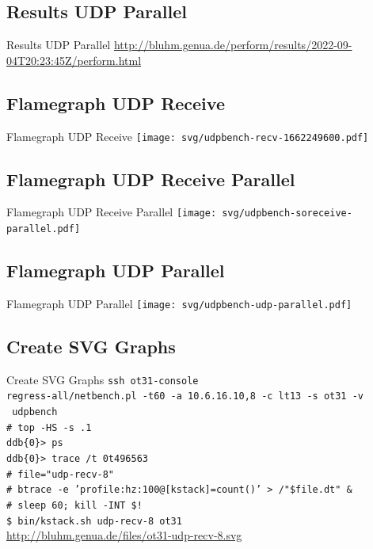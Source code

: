 \documentclass[14pt,aspectratio=169]{beamer}
\begin{document}
\subsection{Results UDP Parallel}
\begin{frame}{Results UDP Parallel}
    \url{
    http://bluhm.genua.de/perform/results/2022-09-04T20:23:45Z/perform.html}
\end{frame}

\subsection{Flamegraph UDP Receive}
\begin{frame}{Flamegraph UDP Receive}
    \texttt{[image: svg/udpbench-recv-1662249600.pdf]}
\end{frame}

\subsection{Flamegraph UDP Receive Parallel}
\begin{frame}{Flamegraph UDP Receive Parallel}
    \texttt{[image: svg/udpbench-soreceive-parallel.pdf]}
\end{frame}

\subsection{Flamegraph UDP Parallel}
\begin{frame}{Flamegraph UDP Parallel}
    \texttt{[image: svg/udpbench-udp-parallel.pdf]}
\end{frame}

\subsection{Create SVG Graphs}
\begin{frame}{Create SVG Graphs}
\small
\texttt{ssh ot31-console}\\
\texttt{regress-all/netbench.pl -t60 -a 10.6.16.10,8 -c lt13 -s ot31 -v \\}
\texttt{ udpbench}\\
\texttt{\# top -HS -s .1}\\
\texttt{ddb\{0\}> ps}\\
\texttt{ddb\{0\}> trace /t 0t496563}\\
\texttt{\# file="udp-recv-8"}\\
\texttt{\# btrace -e 'profile:hz:100{@[kstack]=count()}' >~/"\$file.dt" \&}\\
\texttt{\# sleep 60; kill -INT \$!}\\
\texttt{\$ bin/kstack.sh udp-recv-8 ot31}\\
\url{http://bluhm.genua.de/files/ot31-udp-recv-8.svg}\\
\end{frame}
\end{document}
